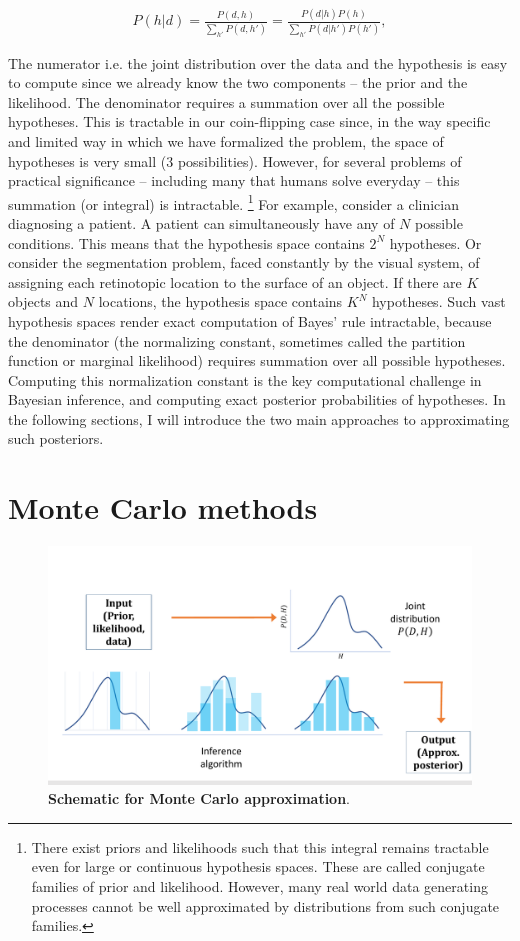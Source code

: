 \begin{align}
    P(h|d) = \frac{P(d, h)}{\sum_{h'} P(d, h')} = \frac{P(d|h)P(h)}{\sum_{h'} P(d|h') P(h')},
\end{align}

The numerator i.e. the joint distribution over the data and the hypothesis is easy to compute since we already know the two components -- the prior and the likelihood. The denominator requires a summation over all the possible hypotheses. This is tractable in our coin-flipping case since, in the way specific and limited way in which we have formalized the problem, the space of hypotheses is very small (3 possibilities). However, for several problems of practical significance -- including many that humans solve everyday -- this summation (or integral) is intractable. \footnote{There exist priors and likelihoods such that this integral remains tractable even for large or continuous hypothesis spaces. These are called conjugate families of prior and likelihood. However, many real world data generating processes cannot be well approximated by distributions from such conjugate families.}  For example, consider a clinician diagnosing a patient. A patient can simultaneously have any of $N$ possible conditions. This means that the hypothesis space contains $2^N$ hypotheses. Or consider the segmentation problem, faced constantly by the visual system, of assigning each retinotopic location to the surface of an object. If there are $K$ objects and $N$ locations, the hypothesis space contains $K^N$ hypotheses. Such vast hypothesis spaces render exact computation of Bayes' rule intractable, because the denominator (the normalizing constant, sometimes called the partition function or marginal likelihood) requires summation over all possible hypotheses. Computing this normalization constant is the key computational challenge in Bayesian inference, and computing exact posterior probabilities of hypotheses. In the following sections, I will introduce the two main approaches to approximating such posteriors.

\section{Monte Carlo methods}
\label{sec:approx_MC}

\begin{figure}
\centering
\includegraphics[width = \textwidth]{figures/MonteCarlo_schematic.pdf}
\caption{\textbf{Schematic for Monte Carlo approximation}. }
\label{fig:MC_schematic}
\end{figure}

